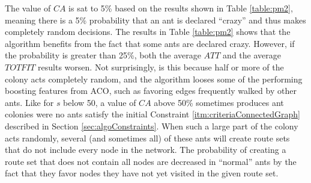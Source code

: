 The value of $CA$ is sat to 5\% based on the results shown in Table \vref{table:pm2}, meaning there is a 5\% probability that an ant is declared ``crazy'' and thus makes completely random decisions. The results in Table \vref{table:pm2} shows that the algorithm benefits from the fact that some ants are declared crazy. However, if the probability is greater than 25\%, both the average $ATT$ and the average $TOTFIT$ results worsen. Not surprisingly, is this because half or more of the colony acts completely random, and the algorithm looses some of the performing boosting features from ACO, such as favoring edges frequently walked by other ants. Like for $s$ below 50, a value of $CA$ above 50\% sometimes produces ant colonies were no ants satisfy the initial Constraint \ref{itm:criteriaConnectedGraph} described in Section \vref{sec:algoConstraints}. When such a large part of the colony acts randomly, several (and sometimes all) of these ants will create route sets that do not include every node in the network. The probability of creating a route set that does not contain all nodes are decreased in ``normal'' ants by the fact that they favor nodes they have not yet visited in the given route set.

